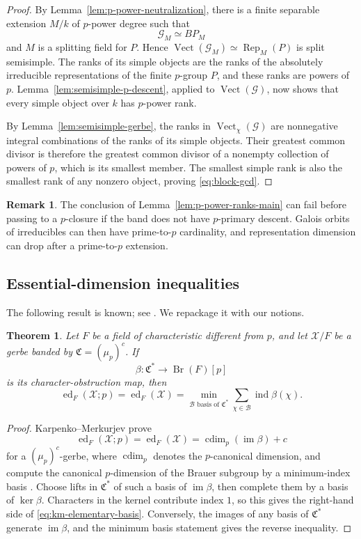 \documentclass[11pt,reqno]{amsart}
\numberwithin{equation}{section}
\theoremstyle{plain}
\newtheorem{theo}[prop]{Theorem}
\theoremstyle{definition}
\newtheorem{rema}[prop]{Remark}
\def\cG{{\mathcal G}}
\def\cX{{\mathcal X}}
\def\fC{{\mathfrak C}}
\def\Br{{\operatorname{Br}}}
\def\ind{{\operatorname{ind}}}
\def\ra{{\rightarrow}}
\def\Vect{{\operatorname{Vect}}}
\def\im{{\operatorname{im}}}
\def\ed{{\operatorname{ed}}}
\def\cdim{{\operatorname{cdim}}}
\begin{document}
\begin{proof}
By Lemma~\ref{lem:p-power-neutralization}, there is a finite separable
extension $M/k$ of $p$-power degree such that
\[
\cG_M\simeq BP_M
\]
and $M$ is a splitting field for $P$.  Hence
$\Vect(\cG_M)\simeq\operatorname{Rep}_M(P)$ is split semisimple.  The ranks of its
simple objects are the ranks of the absolutely irreducible
representations of the finite $p$-group $P$, and these ranks are
powers of $p$.  Lemma~\ref{lem:semisimple-p-descent}, applied to
$\Vect(\cG)$, now shows that every simple object over $k$ has
$p$-power rank.

By Lemma~\ref{lem:semisimple-gerbe}, the ranks in
$\Vect_\chi(\cG)$ are nonnegative integral combinations of the ranks of its
simple objects.  Their greatest common divisor is therefore the greatest
common divisor of a nonempty collection of powers of $p$, which is its
smallest member.  The smallest simple rank is also the smallest rank of any
nonzero object, proving \eqref{eq:block-gcd}.
\end{proof}

\begin{rema}
The conclusion of Lemma~\ref{lem:p-power-ranks-main} can fail before
passing to a $p$-closure if the band does not have $p$-primary
descent.  Galois orbits of irreducibles can then have prime-to-$p$
cardinality, and representation dimension can drop after a prime-to-$p$ extension.
\end{rema}


\subsection{Essential-dimension inequalities}

The following result is known; see \cite[Theorem~3.1]{KM}. We repackage it with our notions.

\begin{theo}
\label{thm:km-elementary-computation}
Let $F$ be a field of characteristic different from $p$, and let $\cX/F$
be a gerbe banded by $\fC=(\mu_p)^c$.  If
\[
\beta:\fC^*\ra\Br(F)[p]
\]
is its character-obstruction map, then
\begin{equation}\label{eq:km-elementary-basis}
\ed_F(\cX;p)=\ed_F(\cX)=
\min_{\mathcal B\text{ basis of }\fC^*}
\sum_{\chi\in\mathcal B}\ind\beta(\chi).
\end{equation}
\end{theo}

\begin{proof}
Karpenko--Merkurjev prove
\[
\ed_F(\cX;p)=\ed_F(\cX)=\cdim_p(\im\beta)+c
\]
for a $(\mu_p)^c$-gerbe, where $\cdim_p$ denotes the $p$-canonical dimension, and compute the canonical $p$-dimension of the Brauer subgroup by a minimum-index basis \cite[Theorems~2.1 and~3.1 and Remark~2.9]{KM}. Choose lifts in $\fC^*$
of such a basis of $\im\beta$, then complete them by a basis of $\ker\beta$. Characters in the kernel contribute index $1$, so this gives the right-hand side of \eqref{eq:km-elementary-basis}. Conversely, the images of any basis of $\fC^*$ generate $\im\beta$, and the minimum basis statement gives the reverse inequality.
\end{proof}
\end{document}
